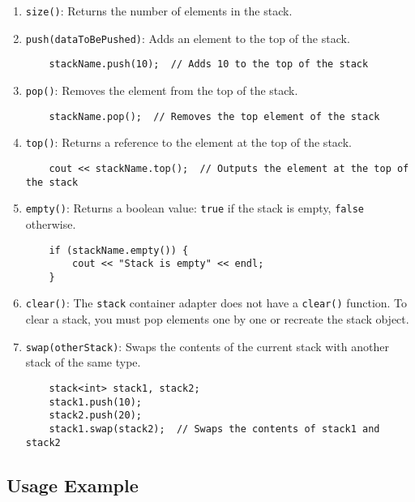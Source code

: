 \documentclass{article}
\begin{document}
\begin{enumerate}
    \item \texttt{size()}: Returns the number of elements in the stack.
    \item \texttt{push(dataToBePushed)}: Adds an element to the top of the stack.
    \begin{lstlisting}
    stackName.push(10);  // Adds 10 to the top of the stack
    \end{lstlisting}
    \item \texttt{pop()}: Removes the element from the top of the stack.
    \begin{lstlisting}
    stackName.pop();  // Removes the top element of the stack
    \end{lstlisting}
    \item \texttt{top()}: Returns a reference to the element at the top of the stack.
    \begin{lstlisting}
    cout << stackName.top();  // Outputs the element at the top of the stack
    \end{lstlisting}
    \item \texttt{empty()}: Returns a boolean value: \texttt{true} if the stack is empty, \texttt{false} otherwise.
    \begin{lstlisting}
    if (stackName.empty()) {
        cout << "Stack is empty" << endl;
    }
    \end{lstlisting}
    \item \texttt{clear()}: The \texttt{stack} container adapter does not have a \texttt{clear()} function. To clear a stack, you must pop elements one by one or recreate the stack object.
    \item \texttt{swap(otherStack)}: Swaps the contents of the current stack with another stack of the same type.
    \begin{lstlisting}
    stack<int> stack1, stack2;
    stack1.push(10);
    stack2.push(20);
    stack1.swap(stack2);  // Swaps the contents of stack1 and stack2
    \end{lstlisting}
\end{enumerate}

\subsection{Usage Example}
\end{document}
